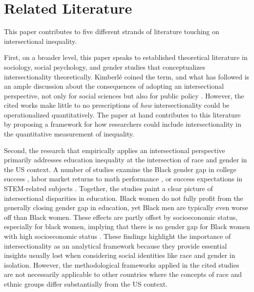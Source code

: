 \section{Related Literature}\label{sec:literature}

This paper contributes to five different strands of literature touching on intersectional inequality. 

First, on a broader level, this paper speaks to established theoretical literature in sociology, social psychology, and gender studies that conceptualizes intersectionality theoretically. Kimberlé \cite{Crenshaw1989} coined the term, and what has followed is an ample discussion about the consequences of adopting an intersectional perspective, not only for social sciences but also for public policy \citep[to name just a few examples:][]{Alexander-Floyd2012, Berger2010, Bowleg2008, Cho2013, Choo2010, Few-Demo2014, Hancock2007, Shields2008, Strid2013, Walby2012}. However, the cited works make little to no prescriptions of \textit{how} intersectionality could be operationalized quantitatively. The paper at hand contributes to this literature by proposing a framework for how researchers could include intersectionality in the quantitative measurement of inequality.

Second, the research that empirically applies an intersectional perspective primarily addresses education inequality at the intersection of race and gender in the US context. A number of studies examine the Black gender gap in college success \citep{Keels2013, McDaniel2011, Mittleman2022}, labor market returns to math performance \citep{Riegle-Crumb2006}, or success expectations in STEM-related subjects \citep[][review article]{Parker2020}. Together, the studies paint a clear picture of intersectional disparities in education. Black women do not fully profit from the generally closing gender gap in education, yet Black men are typically even worse off than Black women. These effects are partly offset by socioeconomic status, especially for black women, implying that there is no gender gap for Black women with high socioeconomic status \citep{Keels2013}. These findings highlight the importance of intersectionality as an analytical framework because they provide essential insights usually lost when considering social identities like race and gender in isolation. However, the methodological frameworks applied in the cited studies are not necessarily applicable to other countries where the concepts of race and ethnic groups differ substantially from the US context.

